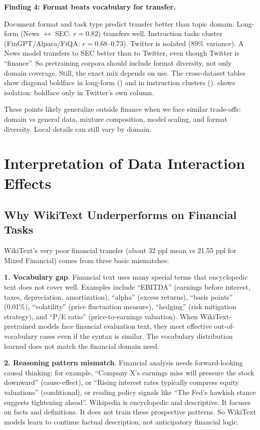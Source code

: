 \textbf{Finding 4: Format beats vocabulary for transfer.}

Document format and task type predict transfer better than topic domain. Long-form (News $\leftrightarrow$ SEC: $r = 0.82$) transfers well. Instruction tasks cluster (FinGPT/Alpaca/FiQA: $r = 0.68$--$0.73$). Twitter is isolated (89\% variance). A News model transfers to SEC better than to Twitter, even though Twitter is ``finance''. So pretraining corpora should include format diversity, not only domain coverage. Still, the exact mix depends on use. The cross-dataset tables show diagonal boldface in long-form () and in instruction clusters ().  shows isolation: boldface only in Twitter's own column.

These points likely generalize outside finance when we face similar trade-offs: domain vs general data, mixture composition, model scaling, and format diversity. Local details can still vary by domain.

\section{Interpretation of Data Interaction Effects}

\subsection{Why WikiText Underperforms on Financial Tasks}

WikiText's very poor financial transfer (about 32 ppl mean vs 21.55 ppl for Mixed Financial) comes from three basic mismatches:

\textbf{1. Vocabulary gap}. Financial text uses many special terms that encyclopedic text does not cover well. Examples include ``EBITDA'' (earnings before interest, taxes, depreciation, amortization), ``alpha'' (excess returns), ``basis points'' (0.01\%), ``volatility'' (price fluctuation measure), ``hedging'' (risk mitigation strategy), and ``P/E ratio'' (price-to-earnings valuation). When WikiText-pretrained models face financial evaluation text, they meet effective out-of-vocabulary cases even if the syntax is similar. The vocabulary distribution learned does not match the financial domain need.

\textbf{2. Reasoning pattern mismatch}. Financial analysis needs forward-looking causal thinking: for example, ``Company X's earnings miss will pressure the stock downward'' (cause-effect), or ``Rising interest rates typically compress equity valuations'' (conditional), or reading policy signals like ``The Fed's hawkish stance suggests tightening ahead''. Wikipedia is encyclopedic and descriptive. It focuses on facts and definitions. It does not train these prospective patterns. So WikiText models learn to continue factual description, not anticipatory financial logic.

